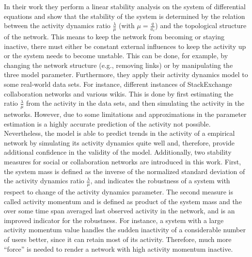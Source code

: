 In their work they perform a linear stability analysis on the system of differential equations and show that the stability of the system is determined by the relation between the activity dynamics ratio \( \frac{\lambda}{\mu} \) (with \( \mu = \frac{q}{a_{c}} \)) and the topological structure of the network.
This means to keep the network from becoming or staying inactive, there must either be constant external influences to keep the activity up or the system needs to become unstable.
This can be done, for example, by changing the network structure (e.g., removing links) or by manipulating the three model parameter.
Furthermore, they apply their activity dynamics model to some real-world data sets.
For instance, different instances of StackExchange collaboration networks and various wikis.
This is done by first estimating the ratio \( \frac{\lambda}{\mu} \) from the activity in the data sets, and then simulating the activity in the networks.
However, due to some limitations and approximations in the parameter estimation is a highly accurate prediction of the activity not possible.
Nevertheless, the model is able to predict trends in the activity of a empirical network by simulating its activity dynamics quite well and, therefore, provide additional confidence in the validity of the model.
Additionally, two stability measures for social or collaboration networks are introduced in this work.
First, the system mass is defined as the inverse of the normalized standard deviation of the activity dynamics ratio \( \frac{\lambda}{\mu} \), and indicates the robustness of a system with respect to change of the activity dynamics parameter.
The second measure is called activity momentum and is defined as product of the system mass and the over some time span averaged last observed activity in the network, and is an improved indicator for the robustness.
For instance, a system with a large activity momentum value handles the sudden inactivity of a considerable number of users better, since it can retain most of its activity.
Therefore, much more \enquote{force} is needed to render a network with high activity momentum inactive.

